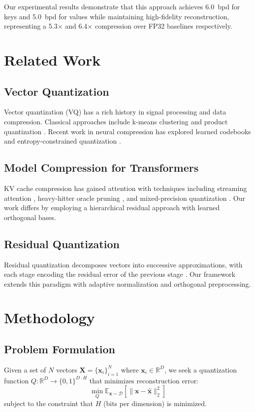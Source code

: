 \documentclass[10pt,conference]{ieeeconf}
\begin{document}
Our experimental results demonstrate that this approach achieves \SI{6.0}{bpd} for keys and \SI{5.0}{bpd} for values while maintaining high-fidelity reconstruction, representing a 5.3$\times$ and 6.4$\times$ compression over FP32 baselines respectively.

\section{Related Work}

\subsection{Vector Quantization}
Vector quantization (VQ) has a rich history in signal processing and data compression. Classical approaches include k-means clustering and product quantization \cite{jegou2010product}. Recent work in neural compression has explored learned codebooks and entropy-constrained quantization \cite{theis2022lossy}.

\subsection{Model Compression for Transformers}
KV cache compression has gained attention with techniques including streaming attention \cite{xiao2023efficient}, heavy-hitter oracle pruning \cite{geva2023dissecting}, and mixed-precision quantization \cite{liu2023squeezeattention}. Our work differs by employing a hierarchical residual approach with learned orthogonal bases.

\subsection{Residual Quantization}
Residual quantization decomposes vectors into successive approximations, with each stage encoding the residual error of the previous stage \cite{babenko2014neural}. Our framework extends this paradigm with adaptive normalization and orthogonal preprocessing.

\section{Methodology}

\subsection{Problem Formulation}
Given a set of $N$ vectors $\mathbf{X} = \{\mathbf{x}_i\}_{i=1}^N$ where $\mathbf{x}_i \in \mathbb{R}^D$, we seek a quantization function $Q: \mathbb{R}^D \rightarrow \{0,1\}^{D \cdot H}$ that minimizes reconstruction error:
\begin{equation}
    \min_Q \mathbb{E}_{\mathbf{x} \sim \mathcal{D}} \left[ \|\mathbf{x} - \hat{\mathbf{x}}\|_2^2 \right]
\end{equation}
subject to the constraint that $H$ (bits per dimension) is minimized.
\end{document}

